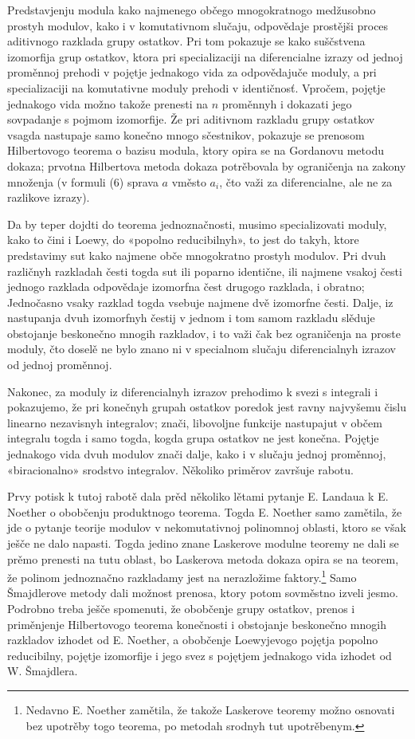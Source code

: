 \documentclass[11pt]{article}
\begin{document}
Predstavjenju modula kako najmenego občego mnogokratnogo medžusobno prostyh modulov, kako i v komutativnom slučaju, odpovědaje prostějši proces aditivnogo razklada grupy ostatkov. Pri tom pokazuje se kako suščstvena izomorfija grup ostatkov, ktora pri specializaciji na diferencialne izrazy od jednoj proměnnoj prehodi v pojętje jednakogo vida za odpovědajuče moduly, a pri specializaciji na komutativne moduly prehodi v identičnosť. Vpročem, pojętje jednakogo vida možno takože prenesti na \(n\) proměnnyh i dokazati jego sovpadanje s pojmom izomorfije. Že pri aditivnom razkladu grupy ostatkov vsagda nastupaje samo konečno mnogo sčestnikov, pokazuje se prenosom Hilbertovogo teorema o bazisu modula, ktory opira se na Gordanovu metodu dokaza; prvotna Hilbertova metoda dokaza potrěbovala by ograničenja na zakony množenja (v formuli (6) sprava \(a\) vměsto \(a_i\), čto važi za diferencialne, ale ne za razlikove izrazy).

Da by teper dojdti do teorema jednoznačnosti, musimo specializovati moduly, kako to čini i Loewy, do «popolno reducibilnyh», to jest do takyh, ktore predstavimy sut kako najmene obče mnogokratno prostyh modulov. Pri dvuh različnyh razkladah česti togda sut ili poparno identične, ili najmene vsakoj česti jednogo razklada odpovědaje izomorfna čest drugogo razklada, i obratno; Jednočasno vsaky razklad togda vsebuje najmene dvě izomorfne česti. Dalje, iz nastupanja dvuh izomorfnyh čestij v jednom i tom samom razkladu slěduje obstojanje beskonečno mnogih razkladov, i to važi čak bez ograničenja na proste moduly, čto doselě ne bylo znano ni v specialnom slučaju diferencialnyh izrazov od jednoj proměnnoj.

Nakonec, za moduly iz diferencialnyh izrazov prehodimo k svezi s integrali i pokazujemo, že pri konečnyh grupah ostatkov poredok jest ravny najvyšemu čislu linearno nezavisnyh integralov; znači, libovoljne funkcije nastupajut v občem integralu togda i samo togda, kogda grupa ostatkov ne jest konečna. Pojętje jednakogo vida dvuh modulov znači dalje, kako i v slučaju jednoj proměnnoj, «biracionalno» srodstvo integralov. Několiko priměrov završuje rabotu.

Prvy potisk k tutoj rabotě dala prěd několiko lětami pytanje E. Landaua k E. Noether o obobčenju produktnogo teorema. Togda E. Noether samo zamětila, že jde o pytanje teorije modulov v nekomutativnoj polinomnoj oblasti, ktoro se však ješče ne dalo napasti. Togda jedino znane Laskerove modulne teoremy ne dali se prěmo prenesti na tutu oblast, bo Laskerova metoda dokaza opira se na teorem, že polinom jednoznačno razkladamy jest na nerazložime faktory.\footnote{Nedavno E. Noether zamětila, že takože Laskerove teoremy možno osnovati bez upotrěby togo teorema, po metodah srodnyh tut upotrěbenym.} Samo Šmajdlerove metody dali možnost prenosa, ktory potom sovměstno izveli jesmo. Podrobno treba ješče spomenuti, že obobčenje grupy ostatkov, prenos i priměnjenje Hilbertovogo teorema konečnosti i obstojanje beskonečno mnogih razkladov izhodet od E. Noether, a obobčenje Loewyjevogo pojętja popolno reducibilny, pojętje izomorfije i jego svez s pojętjem jednakogo vida izhodet od W. Šmajdlera.
\end{document}
